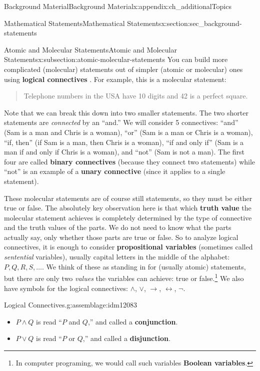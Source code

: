 \documentclass[oneside,10pt,]{book}
\newcommand{\terminology}[1]{\textbf{#1}}
\numberwithin{equation}{chapter}
\def\iff{\leftrightarrow}
\def\imp{\rightarrow}
\begin{document}
\begin{appendixptx}{Background Material}{}{Background Material}{}{}{x:appendix:ch_additionalTopics}
\begin{sectionptx}{Mathematical Statements}{}{Mathematical Statements}{}{}{x:section:sec_background-statements}
\begin{subsectionptx}{Atomic and Molecular Statements}{}{Atomic and Molecular Statements}{}{}{x:subsection:atomic-molecular-statements}
You can build more complicated (molecular) statements out of simpler (atomic or molecular) ones using \terminology{logical connectives} . For example, this is a molecular statement:%
\begin{quote}%
Telephone numbers in the USA have 10 digits and 42 is a perfect square.%
\end{quote}
Note that we can break this down into two smaller statements. The two shorter statements are \emph{connected} by an ``and.'' We will consider 5 connectives: ``and'' (Sam is a man and Chris is a woman), ``or'' (Sam is a man or Chris is a woman), ``if\textellipsis{}, then\textellipsis{}'' (if Sam is a man, then Chris is a woman), ``if and only if'' (Sam is a man if and only if Chris is a woman), and ``not'' (Sam is not a man). The first four are called \terminology{binary connectives} (because they connect two statements) while ``not'' is an example of a \terminology{unary connective} (since it applies to a single statement).%
\par
These molecular statements are of course still statements, so they must be either true or false.  The absolutely key observation here is that which \terminology{truth value}  the molecular statement achieves is completely determined by the type of connective and the truth values of the parts. We do not need to know what the parts actually say, only whether those parts are true or false. So to analyze logical connectives, it is enough to consider \terminology{propositional variables} (sometimes called \emph{sentential} variables), usually capital letters in the middle of the alphabet: \(P, Q, R, S, \ldots\).  We think of these as standing in for (usually atomic) statements, but there are only two \emph{values} the variables can achieve: true or false.\footnote{In computer programing, we would call such variables \terminology{Boolean variables}.\label{g:fn:idm12073}} \label{g:notation:idm12075} We also have symbols for the logical connectives: \(\wedge\), \(\vee\), \(\imp\), \(\iff\), \(\neg\).%
\begin{assemblage}{Logical Connectives.}{g:assemblage:idm12083}%
%
\begin{itemize}[label=\textbullet]
\item{}\(P \wedge Q\) is read ``\(P\) and \(Q\),'' and called a \terminology{conjunction}.  \label{g:notation:idm12098}%
\item{}\(P \vee Q\) is read ``\(P\) or \(Q\),'' and called a \terminology{disjunction}.  \label{g:notation:idm12113}%

\end{itemize}
\end{assemblage}
\end{subsectionptx}
\end{sectionptx}
\end{appendixptx}
\end{document}
